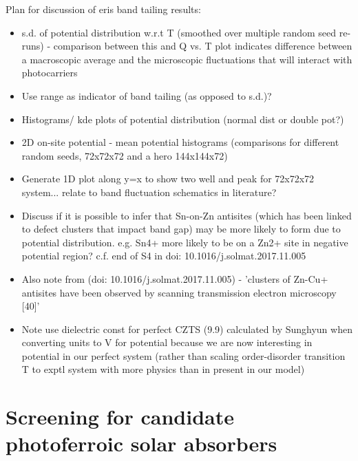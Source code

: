 \documentclass[11pt, twoside]{report}
\begin{document}
Plan for discussion of eris band tailing results:
\begin{itemize}
\item s.d. of potential distribution w.r.t T (smoothed over multiple random seed re-runs) - comparison between this and Q vs. T plot indicates difference between a macroscopic average and the microscopic fluctuations that will interact with photocarriers
\item Use range as indicator of band tailing (as opposed to s.d.)?
\item Histograms/ kde plots of potential distribution (normal dist or double pot?)
\item 2D on-site potential - mean potential histograms (comparisons for different random seeds, 72x72x72 and a hero 144x144x72)
\item Generate 1D plot along y=x to show two well and peak for 72x72x72 system... relate to band fluctuation schematics in literature?
\item Discuss if it is possible to infer that Sn-on-Zn antisites (which has been linked to defect clusters that impact band gap) may be more likely to form due to potential distribution. e.g. Sn4+ more likely to be on a Zn2+ site in negative potential region? c.f. end of S4 in doi: 10.1016/j.solmat.2017.11.005
\item Also note from (doi: 10.1016/j.solmat.2017.11.005) - 'clusters of Zn-Cu+ antisites have been observed by scanning transmission electron microscopy [40]'
\item Note use dielectric const for perfect CZTS (9.9) calculated by Sunghyun when converting units to V for potential because we are now interesting in potential in our perfect system (rather than scaling order-disorder transition T to exptl system with more physics than in present in our model)
\end{itemize}




\chapter{Screening for candidate photoferroic solar absorbers}\label{chap:screening}
\end{document}
